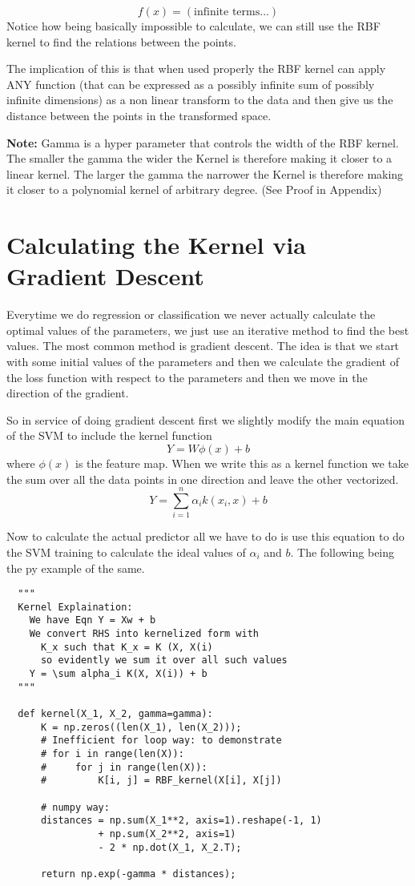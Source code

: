 \documentclass[hidelinks]{book}
\numberwithin{equation}{section}
\begin{document}
  $$ f(x) = (\text{infinite terms...}) $$ Notice how being basically
  impossible to calculate, we can still use the RBF kernel to find the
  relations between the points.

  The implication of this is that when used properly the RBF kernel can
  apply ANY function (that can be expressed as a possibly infinite sum of possibly infinite dimensions)
  as a non linear transform to the data and then give us the distance between
  the points in the transformed space.

  \textbf{Note:} Gamma is a hyper parameter that controls the width of the RBF kernel.
  The smaller the gamma the wider the Kernel is therefore making it closer to a
  linear kernel. The larger the gamma the narrower the Kernel is therefore making
  it closer to a polynomial kernel of arbitrary degree. (See Proof in Appendix)

\section{Calculating the Kernel via Gradient Descent}
  Everytime we do regression or classification we never actually calculate the
  optimal values of the parameters, we just use an iterative method to find
  the best values. The most common method is gradient descent. The idea is
  that we start with some initial values of the parameters and then we
  calculate the gradient of the loss function with respect to the parameters
  and then we move in the direction of the gradient.

  So in service of doing gradient descent first we slightly modify the
  main equation of the SVM to include the kernel function
  $$ Y = W\phi(x) +b $$ where $\phi(x)$ is the feature map. When we write this
  as a kernel function we take the sum over all the data points in one direction
  and leave the other vectorized.
  $$ Y = \sum_{i=1}^n \alpha_i k(x_i, x) + b $$

  Now to calculate the actual predictor all we have to do is use this equation
  to do the SVM training to calculate the ideal values of $\alpha_i$ and $b$.
  The following being the py example of the same.
  \begin{verbatim}
  """
  Kernel Explaination:
    We have Eqn Y = Xw + b
    We convert RHS into kernelized form with
      K_x such that K_x = K (X, X(i)
      so evidently we sum it over all such values
    Y = \sum alpha_i K(X, X(i)) + b
  """

  def kernel(X_1, X_2, gamma=gamma):
      K = np.zeros((len(X_1), len(X_2)));
      # Inefficient for loop way: to demonstrate
      # for i in range(len(X)):
      #     for j in range(len(X)):
      #         K[i, j] = RBF_kernel(X[i], X[j])

      # numpy way:
      distances = np.sum(X_1**2, axis=1).reshape(-1, 1)
                + np.sum(X_2**2, axis=1)
                - 2 * np.dot(X_1, X_2.T);

      return np.exp(-gamma * distances);
  \end{verbatim}
\end{document}
